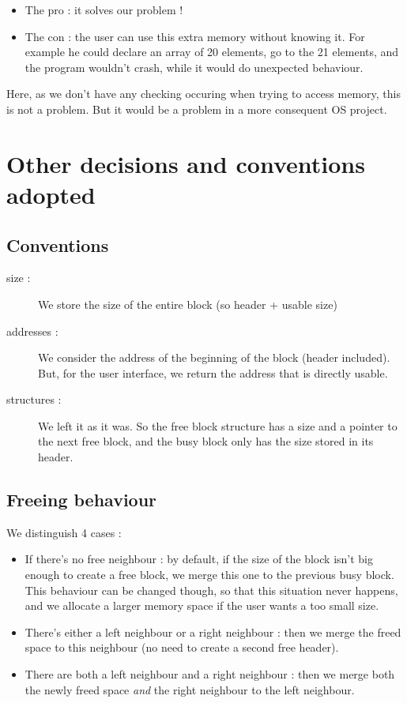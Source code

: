\documentclass[twoside]{article}
\begin{document}
\begin{itemize}
	\item The pro : it solves our problem !
	\item The con : the user can use this extra memory without knowing it. For 
		example he could declare an array of 20 elements, go to the 21 elements,
		and the program wouldn't crash, while it would do unexpected behaviour.
\end{itemize}

Here, as we don't have any checking occuring when trying to access memory,
this is not a problem. But it would be a problem in a more consequent OS 
project.

\section{Other decisions and conventions adopted}
\subsection{Conventions}
\begin{description}
	\item[size :] We store the size of the entire block (so header + usable 
		size)
	\item[addresses :] We consider the address of the beginning of the block
		(header included). But, for the user interface, we return the address
		that is directly usable.
	\item[structures :] We left it as it was. So the free block structure has
		a size and a pointer to the next free block, and the busy block only
		has the size stored in its header.
\end{description}

\subsection{Freeing behaviour}
We distinguish 4 cases :
\begin{itemize}
	\item If there's no free neighbour : by default, if the size of the block
		isn't big enough to create a free block, we merge this one to the
		previous busy block. This behaviour can be changed though, so that this
		situation never happens, and we allocate a larger memory space if the
		user wants a too small size.
	\item There's either a left neighbour or a right neighbour : then we merge
		the freed space to this neighbour (no need to create a second free
		header).
	\item There are both a left neighbour and a right neighbour : then we merge
		both the newly freed space \emph{and} the right neighbour to the left
		neighbour.
\end{itemize}
\end{document}
